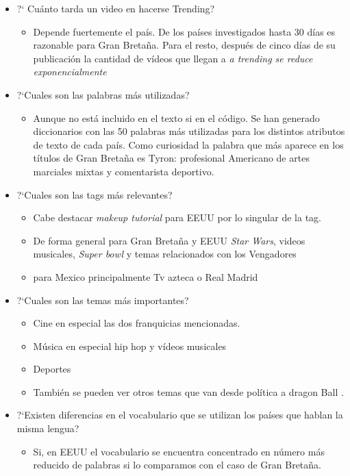 \documentclass[a4paper,12pt]{article}
\begin{document}
\begin{itemize}
\item ?` Cu\'anto tarda un video en hacerse Trending?
\begin{itemize}
\item Depende fuertemente el pa\'is. De los pa\'ises investigados hasta 30 d\'ias es razonable para Gran Breta\~na. Para el resto, despu\'es de cinco d\'ias de su publicaci\'on la cantidad de v\'ideos que llegan a {\itshape a trending se reduce exponencialmente}
\end{itemize}
\item ?`Cuales son las palabras m\'as utilizadas?
\begin{itemize}
\item Aunque no est\'a incluido en el texto si en el c\'odigo. Se han generado diccionarios con las 50 palabras m\'as utilizadas para los distintos atributos de texto de cada pa\'is. Como curiosidad la palabra que m\'as aparece en los t\'itulos de Gran Breta\~na es Tyron: profesional Americano de artes marciales mixtas y comentarista deportivo.
\end{itemize}
\item ?`Cuales son las tags m\'as relevantes?
\begin{itemize}
\item Cabe destacar {\itshape makeup tutorial} para EEUU por lo singular de la tag.
\item De forma general para Gran Breta\~na y EEUU {\itshape Star Wars}, videos musicales, {\itshape Super bowl} y temas relacionados con los Vengadores
\item para Mexico principalmente Tv azteca o Real Madrid  
\end{itemize}
\item ?`Cuales son las temas m\'as importantes?
\begin{itemize}
\item Cine en especial las dos franquicias mencionadas.
\item M\'usica en especial hip hop y v\'ideos musicales
\item Deportes
\item Tambi\'en se pueden ver otros temas que van desde pol\'itica a dragon Ball .
\end{itemize}
\item ?`Existen diferencias en el vocabulario que se utilizan los pa\'ises que hablan la misma lengua?
\begin{itemize}
\item Si, en EEUU el vocabulario se encuentra concentrado en n\'umero m\'as reducido de palabras si lo comparamos con el caso de Gran Breta\~na.
\end{itemize}


\end{itemize}
\end{document}
